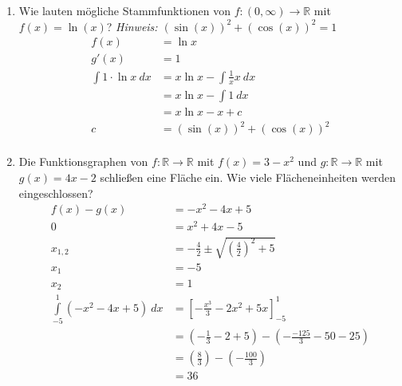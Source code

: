 \documentclass[12pt]{article}
\begin{document}
\begin{enumerate}[start=1,label={\bfseries Frage \arabic*:},leftmargin=1in]
    \item Wie lauten mögliche Stammfunktionen von $f:(0,\infty) \to \mathbb{R}$ mit $f(x)=\ln{(x)}$?
    \textit{Hinweis: $(\sin{(x)})^2 + (\cos{(x)})^2 = 1$}
    \begin{align*}
        f(x)&=\ln{x} \\
        g'(x)&=1 \\
        \int 1 \cdot \ln{x} \: dx &= x\ln{x} - \int \frac{1}{x} x \: dx \\
        &= x\ln{x} - \int 1 \: dx \\
        &= x \ln{x} - x + c \\
        c &= (\sin{(x)})^2 + (\cos{(x)})^2 \\
    \end{align*}

    \item Die Funktionsgraphen von $f:\mathbb{R} \to \mathbb{R}$ mit $f(x)=3-x^2$ und $g:\mathbb{R} \to \mathbb{R}$ mit $g(x)=4x-2$ schließen eine Fläche ein. Wie viele Flächeneinheiten werden eingeschlossen?
    \begin{align*}
        f(x)-g(x) &=-x^2 -4x +5 \\
        0&=x^2 + 4x -5 \\
        x_{1,2} &= -\frac{4}{2} \pm \sqrt{\left(\frac{4}{2}\right)^2 + 5} \\
        x_1 &= -5 \\
        x_2 &= 1 \\
        \int\limits_{-5}^{1} \left(-x^2 -4x +5\right) \: dx &= \left[-\frac{x^3}{3} - 2x^{2} + 5x \right]_{-5}^{1}\\
        &=\left(-\frac{1}{3} - 2 + 5\right) - \left(-\frac{-125}{3} - 50 - 25\right) \\
        &=\left(\frac{8}{3}\right) - \left(-\frac{100}{3}\right) \\
        &=36
    \end{align*}
\end{enumerate}
\end{document}
